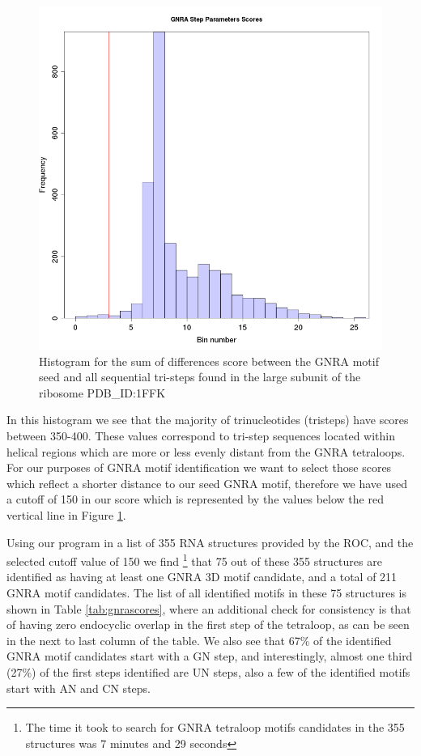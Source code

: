 \begin{figure}
\centering 
\includegraphics[angle=0, scale=0.5]{Chapter5/gnrahisto.png}
\caption{Histogram for  the sum of differences score  between the GNRA
  motif seed and  all sequential tri-steps found in  the large subunit
  of the ribosome PDB\_ID:1FFK}
\label{fig:gnrahist}
\end{figure}

In  this  histogram  we   see  that  the  majority  of  trinucleotides
(tristeps) have scores between  350-400. These values
correspond to tri-step sequences located within helical regions which
are  more or less  evenly distant  from the  GNRA tetraloops.  For our
purposes of GNRA  motif identification we want to  select those scores
which reflect a shorter distance  to our seed GNRA motif, therefore we
have used  a cutoff of  150 in our  score which is represented  by the
values below the red vertical line in Figure \ref{fig:gnrahist}.

Using our program in a list of 355 RNA structures provided by the ROC,
and the  selected cutoff  value of 150  we find \footnote{The  time it
  took  to search  for GNRA  tetraloop  motifs candidates  in the  355
  structures was  7 minutes and 29  seconds} that 75 out  of these 355
structures  are  identified as  having  at  least  one GNRA  3D  motif
candidate, and a total of 211  GNRA motif candidates.  The list of all
identified  motifs   in  these  75   structures  is  shown   in  Table
\ref{tab:gnrascores},  where an  additional check  for  consistency is
that  of having  zero  endocyclic overlap  in  the first  step of  the
tetraloop, as can be seen in the next to last column of the table.  We
also see that 67\% of  the identified GNRA motif candidates start with
a GN  step, and  interestingly, almost one  third (27\%) of  the first
steps identified  are UN  steps, also a  few of the  identified motifs
start with AN and CN steps.

